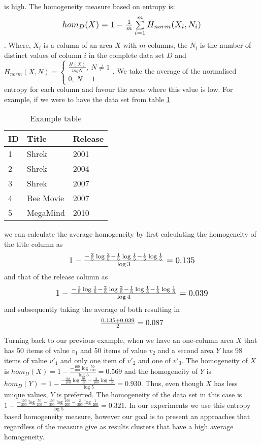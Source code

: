 is high. The homogeneity measure based on entropy is: \[\scalebox{1.2}{$hom_D(X) = 1 - \frac{1}{m} \sum\limits_{i=1}^m H_{norm}(X_i, N_i)$}\]. Where, $X_i$ is a column of an area $X$ with $m$ columns, the $N_i$ is the number of distinct values of column $i$ in the complete data set $D$ and $H_{norm}(X, N) = \left\{
\begin{array}{ll} 
    \frac{H(X)}{log N}, \ N \neq 1 \\
    0, \ N = 1
\end{array} 
\right.$.
We take the average of the normalised entropy for each column and favour the areas where this value is low. For example, if we were to have the data set from table \ref{tab:ExampleTable}
\begin{table}[H]
\centering
\begin{tabular}{|l|l|l|}
\hline
ID & Title     & Release \\ \hline
1  & Shrek     & 2001    \\ \hline
2  & Shrek     & 2004    \\ \hline
3  & Shrek     & 2007    \\ \hline
4  & Bee Movie & 2007    \\ \hline
5  & MegaMind  & 2010    \\ \hline
\end{tabular}
\caption{Example table}
\label{tab:ExampleTable}
\end{table}

we can calculate the average homogeneity by first calculating the homogeneity of the title column as \[ \scalebox{1.2}{$1-\frac{-\frac{3}{5}\log\frac{3}{5}-\frac{1}{5}\log\frac{1}{5}-\frac{1}{5}\log\frac{1}{5}}{\log 3}=0.135$}\] and that of the release column as
\[ \scalebox{1.2}{$1-\frac{-\frac{1}{5}\log\frac{1}{5}-\frac{2}{5}\log\frac{2}{5}-\frac{1}{5}\log\frac{1}{5}-\frac{1}{5}\log\frac{1}{5}}{\log 4}=0.039$}\] and subsequently taking the average of both resulting in
\[ \scalebox{1.1}{$\frac{0.135+0.039}{2}=0.087$} \]

Turning back to our previous example, when we have an one-column area $X$ that has 50 items of value $v_1$ and 50 items of value $v_2$ and a second area $Y$ has 98 items of value $v'_1$ and only one item of $v'_2$ and one of $v'_3$. The homogeneity of $X$ is $hom_D(X) = 1 - \frac{ - \frac{100}{100} \log \frac{50}{100}}{\log 5} = 0.569$ and the homogeneity of $Y$ is $hom_D(Y) = 1 - \frac{- \frac{98}{100} \log \frac{98}{100} - \frac{2}{100} \log \frac{1}{100}}{\log 5} = 0.930$. Thus, even though $X$ has less unique values, $Y$ is preferred. The homogeneity of the data set in this case is $1 - \frac{- \frac{100}{200} \log \frac{50}{200} - \frac{100}{200} \log \frac{100}{200} - \frac{2}{200} \log \frac{1}{200}}{\log 5} = 0.321$. In our experiments we use this entropy based homogeneity measure, however our goal is to present an approaches that regardless of the measure give as results clusters that have a high average homogeneity. 